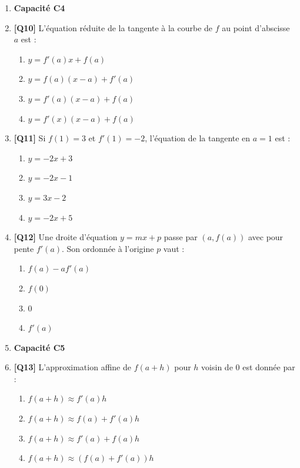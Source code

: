\begin{enumerate}
\item[] \textbf{Capacité C4}

\item \textbf{[Q10]} L'équation réduite de la tangente à la courbe de $f$ au point d'abscisse $a$ est :
  \begin{enumerate}[label=\Alph*.]
    \item $y = f'(a)x + f(a)$
    \item $y = f(a)(x - a) + f'(a)$
    \item $y = f'(a)(x - a) + f(a)$
    \item $y = f'(x)(x - a) + f(a)$
  \end{enumerate}

\item \textbf{[Q11]} Si $f(1)=3$ et $f'(1)=-2$, l'équation de la tangente en $a=1$ est :
  \begin{enumerate}[label=\Alph*.]
    \item $y = -2x + 3$
    \item $y = -2x - 1$
    \item $y = 3x - 2$
    \item $y = -2x + 5$
  \end{enumerate}

\item \textbf{[Q12]} Une droite d'équation $y = mx + p$ passe par $(a, f(a))$ avec pour pente $f'(a)$. Son ordonnée à l'origine $p$ vaut :
  \begin{enumerate}[label=\Alph*.]
    \item $f(a) - a f'(a)$
    \item $f(0)$
    \item $0$
    \item $f'(a)$
  \end{enumerate}

\item[] \textbf{Capacité C5}

\item \textbf{[Q13]} L'approximation affine de $f(a+h)$ pour $h$ voisin de 0 est donnée par :
  \begin{enumerate}[label=\Alph*.]
    \item $f(a+h) \approx f'(a) h$
    \item $f(a+h) \approx f(a) + f'(a) h$
    \item $f(a+h) \approx f'(a) + f(a) h$
    \item $f(a+h) \approx (f(a) + f'(a)) h$
  \end{enumerate}


\end{enumerate}
